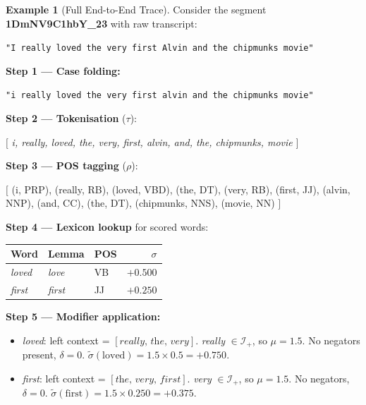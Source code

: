 \documentclass[12pt,a4paper]{article}
\theoremstyle{plain}
\theoremstyle{definition}
\newtheorem{example}[theorem]{Example}
\begin{document}
\begin{example}[Full End-to-End Trace]
\label{ex:trace}
  Consider the segment \textbf{1DmNV9C1hbY\_23} with raw transcript:
  \begin{center}
    \texttt{"I really loved the very first Alvin and the chipmunks movie"}
  \end{center}

  \textbf{Step 1 — Case folding:}
  \begin{center}
    \texttt{"i really loved the very first alvin and the chipmunks movie"}
  \end{center}

  \textbf{Step 2 — Tokenisation} ($\tau$):
  \begin{center}
    $[$ \textit{i, really, loved, the, very, first, alvin, and,
                the, chipmunks, movie} $]$
  \end{center}

  \textbf{Step 3 — POS tagging} ($\rho$):
  \begin{center}
    $[$ (i, PRP), (really, RB), (loved, VBD), (the, DT),
    (very, RB), (first, JJ), (alvin, NNP), (and, CC),
    (the, DT), (chipmunks, NNS), (movie, NN) $]$
  \end{center}

  \textbf{Step 4 — Lexicon lookup} for scored words:
  \begin{center}
    \begin{tabular}{lllr}
      \toprule
      Word & Lemma & POS & $\sigma$ \\
      \midrule
      \textit{loved}  & \textit{love}  & VB  & $+0.500$ \\
      \textit{first}  & \textit{first} & JJ  & $+0.250$ \\
      \bottomrule
    \end{tabular}
  \end{center}

  \textbf{Step 5 — Modifier application:}
  \begin{itemize}
    \item \textit{loved}: left context = $[\textit{really, the, very}]$.
      \textit{really} $\in \mathcal{I}_+$, so $\mu = 1.5$.
      No negators present, $\delta = 0$.
      $\tilde{\sigma}(\text{loved}) = 1.5 \times 0.5 = +0.750$.
    \item \textit{first}: left context = $[\textit{the, very, first}]$.
      \textit{very} $\in \mathcal{I}_+$, so $\mu = 1.5$.
      No negators, $\delta = 0$.
      $\tilde{\sigma}(\text{first}) = 1.5 \times 0.250 = +0.375$.
  \end{itemize}


\end{example}
\end{document}
